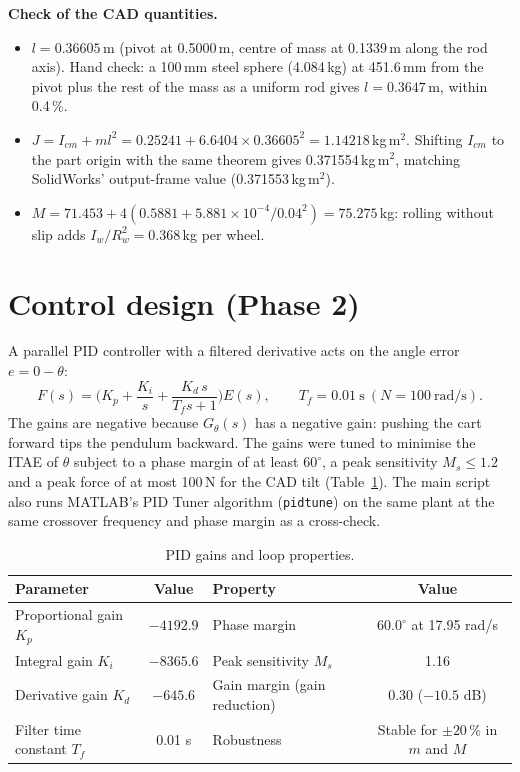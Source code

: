 \documentclass[10pt,a4paper]{article}
\newcommand{\hdr}{\rowcolor{headgrey}}
\begin{document}
\textbf{Check of the CAD quantities.}
\begin{itemize}
  \item $l = 0.36605$\,m (pivot at 0.5000\,m, centre of mass at 0.1339\,m along the rod axis). Hand check:
        a 100\,mm steel sphere (4.084\,kg) at 451.6\,mm from the pivot plus the rest of the mass as a uniform
        rod gives $l = 0.3647$\,m, within 0.4\,\%.
  \item $J = I_{cm} + ml^2 = 0.25241 + 6.6404\times0.36605^2 = 1.14218$\,kg\,m$^2$. Shifting $I_{cm}$ to the
        part origin with the same theorem gives 0.371554\,kg\,m$^2$, matching SolidWorks' output-frame value
        (0.371553\,kg\,m$^2$).
  \item $M = 71.453 + 4(0.5881 + 5.881\times10^{-4}/0.04^2) = 75.275$\,kg: rolling without slip adds
        $I_w/R_w^2 = 0.368$\,kg per wheel.
\end{itemize}

\section{Control design (Phase 2)}
A parallel PID controller with a filtered derivative acts on the angle error $e = 0-\theta$:
\begin{equation}
F(s) = \Big(K_p + \frac{K_i}{s} + \frac{K_d\,s}{T_f s+1}\Big)E(s),\qquad T_f = 0.01\ \text{s}\ (N = 100\ \text{rad/s}).
\end{equation}
The gains are negative because $G_\theta(s)$ has a negative gain: pushing the cart forward tips the
pendulum backward. The gains were tuned to minimise the ITAE of $\theta$ subject to a phase margin of at
least $60^\circ$, a peak sensitivity $M_s \le 1.2$ and a peak force of at most 100\,N for the CAD tilt
(Table~\ref{tab:pid}). The main script also runs MATLAB's PID Tuner algorithm (\texttt{pidtune}) on the same
plant at the same crossover frequency and phase margin as a cross-check.

\begin{table}[H]
\centering\small
\caption{PID gains and loop properties.}
\label{tab:pid}
\begin{tabular}{|l|c||l|c|}
\hline \hdr
\textbf{Parameter} & \textbf{Value} & \textbf{Property} & \textbf{Value} \\ \hline
Proportional gain $K_p$ & $-4192.9$ & Phase margin & $60.0^\circ$ at 17.95 rad/s \\ \hline
Integral gain $K_i$ & $-8365.6$ & Peak sensitivity $M_s$ & 1.16 \\ \hline
Derivative gain $K_d$ & $-645.6$ & Gain margin (gain reduction) & 0.30 ($-10.5$ dB) \\ \hline
Filter time constant $T_f$ & 0.01 s & Robustness & Stable for $\pm20\,\%$ in $m$ and $M$ \\ \hline
\end{tabular}
\end{table}
\end{document}
